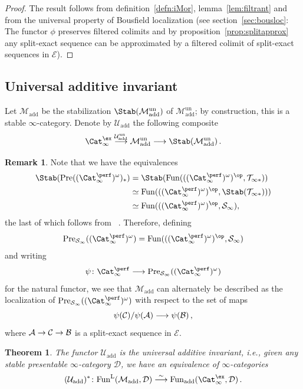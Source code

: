 \documentclass{amsart}
\newcommand{\htp}{\simeq}
\renewcommand{\to}{\mathchoice{\longrightarrow}{\rightarrow}{\rightarrow}{\rightarrow}}
\newcommand{\cA}{{\mathcal A}}
\newcommand{\cB}{{\mathcal B}}
\newcommand{\cC}{{\mathcal C}}
\newcommand{\cE}{{\mathcal E}}
\newcommand{\cM}{{\mathcal M}}
\newcommand{\cU}{{\mathcal U}}
\let\catsymbfont\mathcal
\newcommand{\aA}{{\catsymbfont{A}}}
\newcommand{\aB}{{\catsymbfont{B}}}
\newcommand{\aC}{{\catsymbfont{C}}}
\newcommand{\aD}{{\catsymbfont{D}}}
\newcommand{\aE}{{\catsymbfont{E}}}
\newcommand{\aS}{{\catsymbfont{S}}}
\newcommand{\aT}{{\catsymbfont{T}}}
\renewcommand{\L}{\mathrm{L}}
\newcommand{\Pre}{\mathrm{Pre}}
\newcommand{\stabcat}{\Cat_\i^{\ex}}
\newcommand{\idemstabcat}{\Cat_\i^{\perf}}
\newcommand{\Fun}{\mathrm{Fun}} %
\newcommand{\ispec}{\aS_{\infty}}
\newcommand{\too}{\longrightarrow}%
\renewcommand{\i}{\infty}
\newcommand{\Motadd}{\cM_{\mathrm{add}}}
\newcommand{\Motaddun}{\cM_{\mathrm{add}}^{\mathrm{un}}}
\newcommand{\Umot}{\cU_{\mathrm{add}}}
\newcommand{\Umotun}{\cU_{\mathrm{add}}^{\mathrm{un}}}
\numberwithin{equation}{section}
\newtheorem{theorem}[equation]{Theorem}
\theoremstyle{definition}
\newtheorem{remark}[equation]{Remark}
\begin{document}
\begin{proof}
The result follows from definition~\ref{defn:iMor},
lemma~\ref{lem:filtrant} and from the universal property of Bousfield
localization (see section~\ref{sec:bousloc}: The functor $\phi$
preserves filtered colimits and by proposition~\ref{prop:splitapprox}
any split-exact sequence can be approximated by a filtered colimit of
split-exact sequences in $\aE$).
\end{proof}

\subsection{Universal additive invariant}
Let $\Motadd$ be the stabilization $\Stab(\Motaddun)$
\cite[\S 1.4]{HAG} of $\Motaddun$; by construction, this is a
stable $\i$-category. Denote by $\Umot$ the following composite
$$ \stabcat \stackrel{\Umotun}{\too} \Motaddun \too \Stab(\Motaddun)\,.$$
\begin{remark}
Note that we have the equivalences
\begin{align*}
\Stab(\Pre((\idemstabcat)^{\omega})_*)
&= \Stab(\Fun(((\idemstabcat)^{\omega})^{\op}, \aT_{\i *})) \\
&\htp \Fun(((\idemstabcat)^{\omega})^{\op}, \Stab(\aT_{\i *}))) \\
&\htp \Fun(((\idemstabcat)^{\omega})^{\op}, \ispec),
\end{align*}
the last of which follows from~ \cite[1.4.4.11]{HAG}. Therefore,
defining
\[
\Pre_{\ispec}((\idemstabcat)^{\omega}) =
\Fun(((\idemstabcat)^{\omega})^{\op}, \ispec)
\] 
and writing
\[
\psi \colon \idemstabcat \too \Pre_{\ispec}((\idemstabcat)^{\omega})
\]
for the natural functor, we see that $\Motadd$ can alternately be
described as the localization of $\Pre_{\ispec}((\idemstabcat)^{\omega})$ with respect to the set of maps
\begin{equation}\label{eq:loc}
\psi(\aC)/\psi(\aA) \to \psi(\aB)\,,
\end{equation}
where $\cA \to \cC \to \cB$ is a split-exact sequence in $\cE$.
\end{remark}
\begin{theorem}\label{thm:main1}
The functor $\Umot$ is the {\em universal additive invariant}, i.e.,
given any stable presentable $\i$-category $\aD$, we have an
equivalence of $\i$-categories
\[
(\Umot)^{\ast} \colon \Fun^{\L}(\Motadd, \aD) \stackrel{\sim}{\too}
\Fun_{\mathrm{add}}(\stabcat, \aD)\,.
\]
\end{theorem}
\end{document}
